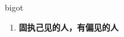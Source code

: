 
\begin{frame}
{\huge bigot}
\begin{center}
\begin{enumerate}\Large
  \item \textbf{固执己见的人，有偏见的人}
\end{enumerate}
\end{center}
\end{frame}
